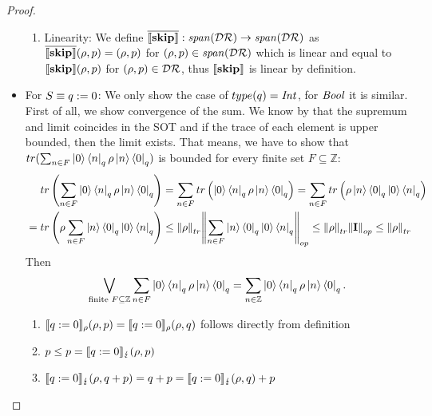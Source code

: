 \documentclass[a4paper,UKenglish,cleveref, autoref, thm-restate]{lipics-v2021}
\begin{document}
\begin{proof}
\begin{itemize}
\begin{enumerate}
            \item Linearity:
            We define $\overline{\llbracket \mathbf{skip} \rrbracket}: \mathit{span}(\mathcal{D}\mathcal{R}) \to \mathit{span}(\mathcal{D}\mathcal{R})$ as $\overline{\llbracket \mathbf{skip} \rrbracket}(\rho,p) = (\rho,p)$ for $(\rho,p) \in \mathit{span}(\mathcal{D}\mathcal{R})$ which is linear and equal to $\llbracket \mathbf{skip} \rrbracket(\rho,p)$ for $(\rho,p) \in \mathcal{D}\mathcal{R}$, thus $\llbracket \mathbf{skip} \rrbracket$ is linear by definition.
\end{enumerate}
        \item For $S\equiv q:=0$: We only show the case of $type(q)=\mathit{Int}$, for $\mathit{Bool}$ it is similar. First of all, we show convergence of the sum.
        We know by \cite[Lem. 30]{heisenbergdualityUnruh} that the supremum and limit coincides in the SOT and if the trace of each element is upper bounded, then the limit exists. That means, we have to show that $tr(\sum_{n\in F} \ket{0} \bra{n}_q \rho \ket{n} \bra{0}_q)$ is bounded for every finite set $F\subseteq \mathbb{Z}$:
        \begin{align*}
            &\phantom{=.}tr\left(\sum_{n\in F} \ket{0} \bra{n}_q \rho \ket{n} \bra{0}_q\right) = \sum_{n\in F} tr\left(\ket{0} \bra{n}_q \rho \ket{n} \bra{0}_q\right) = \sum_{n\in F} tr\left(\rho \ket{n} \bra{0}_q \ket{0} \bra{n}_q  \right) \\
            &= tr\left(\rho \sum_{n\in F} \ket{n} \bra{0}_q \ket{0} \bra{n}_q \right)
            \leq \norm{\rho}_{tr}  \norm{\sum_{n\in F} \ket{n} \bra{0}_q \ket{0} \bra{n}_q}_{op} \leq \norm{\rho}_{tr} \norm{\textbf{I}}_{op} \leq \norm{\rho}_{tr}
        \end{align*}
        Then \begin{align*}
            \bigvee_{\text{finite }F \subseteq \mathbb{Z}} \sum_{n \in F} \ket{0} \bra{n}_q \rho \ket{n} \bra{0}_q = \sum_{n\in \mathbb{Z}} \ket{0} \bra{n}_q \rho \ket{n} \bra{0}_q.
        \end{align*}
        \begin{enumerate}
            \item $\llbracket q:=0 \rrbracket_{\rho}(\rho,p) = \llbracket q:=0 \rrbracket_{\rho}(\rho,q)$ follows directly from definition

            \item $p \leq p = \llbracket q:=0 \rrbracket_{\lightning}(\rho,p)$

            \item $\llbracket q:=0 \rrbracket_{\lightning}(\rho,q+p) = q+p =\llbracket q:=0 \rrbracket_{\lightning}(\rho,q) + p$


\end{enumerate}
\end{itemize}
\end{proof}
\end{document}
